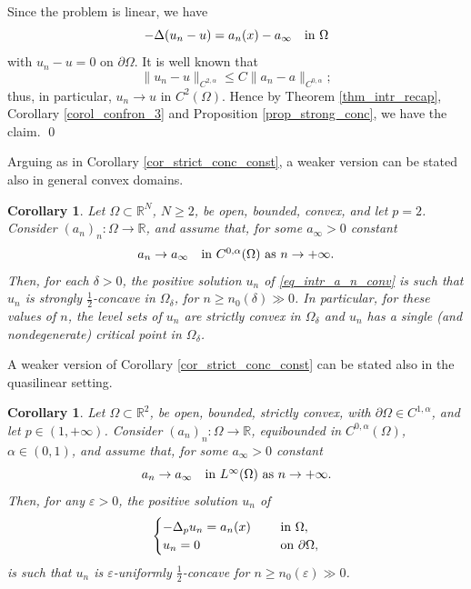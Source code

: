 \documentclass[11pt, reqno]{amsart}
\newtheorem{corollary}[lemma]{Corollary}
\theoremstyle{definition}
\numberwithin{equation}{section}
\newcommand{\R}{\mathbb{R}}
\def\eps{\varepsilon}
\def\norm#1{\|#1\|}
\renewenvironment{proof}[1][\proofname]{\medskip \noindent {\bfseries #1. }}{\qed \bigskip}
\begin{document}
\begin{proof}[Proof of Corollary \ref{cor_strict_conc_const}]
Since the problem is linear, we have
$$-\Delta(u_n - u) = a_n(x) - a_{\infty} \quad \hbox{in $\Omega$}$$
with $u_n-u=0$ on $\partial \Omega$. It is well known that \cite[Theorem 2.30]{FrRo22}
$$\norm{u_n-u}_{C^{2,\alpha}} \leq C \norm{a_n - a}_{C^{0,\alpha}};$$
thus, in particular, $u_n \to u$ in $C^2(\Omega)$. Hence by Theorem \ref{thm_intr_recap}, Corollary \ref{corol_confron_3} and Proposition \ref{prop_strong_conc}, we have the claim.
\end{proof}


Arguing as in Corollary \ref{cor_strict_conc_const}, a weaker version can be stated also in general convex domains.

\begin{corollary}
Let $\Omega \subset \R^N$, $N\geq 2$, be open, bounded, convex, and let $p=2$. 
Consider $(a_n)_n : \Omega \to \R$, and assume that, for some $a_{\infty}>0$ constant
$$a_n\to a_{\infty} \quad \hbox{in $C^{0,\alpha}(\Omega)$ as $n \to +\infty$}.$$
Then, for each $\delta>0$, the positive solution $u_n$ of \eqref{eq_intr_a_n_conv} is such that $u_n$ is strongly $\frac{1}{2}$-concave in $ \Omega_{\delta}$, for $n \geq n_0(\delta) \gg 0$. 
In particular, for these values of $n$, the level sets of $u_n$ are strictly convex in $\Omega_{\delta}$ and $u_n$ has a single (and nondegenerate) critical point in $\Omega_{\delta}$. 
\end{corollary}



A weaker version of Corollary \ref{cor_strict_conc_const} can be stated also in the quasilinear setting. 
\begin{corollary}
\label{cor_uniform_eps_conc_const}
Let $\Omega \subset \R^2$, be open, bounded, strictly convex, with $\partial \Omega \in C^{1,\alpha}$,
and let $p\in (1,+\infty)$.
Consider $(a_n)_n : \Omega \to \R$, equibounded in $C^{0,\alpha}(\Omega)$, $\alpha \in (0,1)$, 
and assume that, for some $a_{\infty}>0$ constant
$$a_n\to a_{\infty} \quad \hbox{in $L^{\infty}(\Omega)$ as $n \to +\infty$}.$$
Then, for any $\eps>0$, the positive solution $u_n$ of 
$$\begin{cases}
-\Delta_p u_n = a_n(x) & \quad \hbox{ in $\Omega$},\\ 
u_n =0 & \quad \hbox{ on $\partial \Omega$},
\end{cases}$$
is such that $u_n$ is $\eps$-uniformly $\frac{1}{2}$-concave for $n \geq n_0(\eps) \gg 0$.
\end{corollary}
\end{document}
